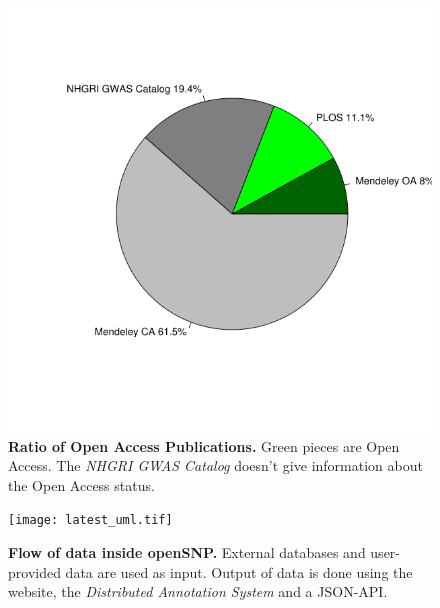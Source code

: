 \documentclass[10pt]{article}
\begin{document}
\begin{figure}[!ht]
	\begin{center}
		\includegraphics[scale=0.6]{25_10_2012_Graphs/new_pie.tif}
	\end{center}
	\caption{
	{\bf Ratio of Open Access Publications.} Green pieces are Open Access. The \emph{NHGRI GWAS Catalog} doesn't give information about the Open Access status.}
	\label{oa_label}
\end{figure}

\begin{figure}[!ht]
	\begin{center}
	  \texttt{[image: latest\_uml.tif]}
	\end{center}
	\caption{
	{\bf Flow of data inside openSNP.} External databases and user-provided data are used as input. Output of data is done using the website, the \emph{Distributed Annotation System} and a JSON-API.} 
	\label{Figure4_label}
\end{figure}



\end{document}
